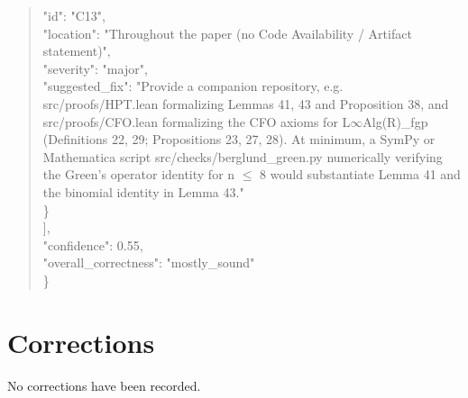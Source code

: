 \documentclass[11pt]{article}
\begin{document}
\begin{quote}
      "id": "C13",\\
      "location": "Throughout the paper (no Code Availability / Artifact statement)",\\
      "severity": "major",\\
      "suggested\_fix": "Provide a companion repository, e.g. src/proofs/HPT.lean formalizing Lemmas 41, 43 and Proposition 38, and src/proofs/CFO.lean formalizing the CFO axioms for L\ensuremath{\infty}Alg(R)\_fgp (Definitions 22, 29; Propositions 23, 27, 28). At minimum, a SymPy or Mathematica script src/checks/berglund\_green.py numerically verifying the Green's operator identity for n \ensuremath{\le} 8 would substantiate Lemma 41 and the binomial identity in Lemma 43."\\
    \}\\
  ],\\
  "confidence": 0.55,\\
  "overall\_correctness": "mostly\_sound"\\
\}\\
\end{quote}

\section*{Corrections}
No corrections have been recorded.
\end{document}
